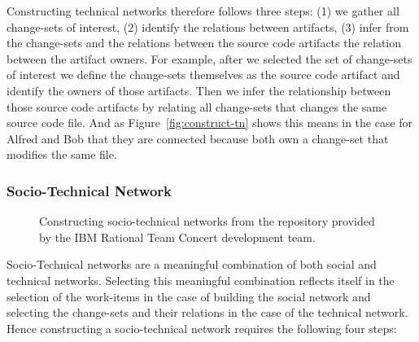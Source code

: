 Constructing technical networks therefore follows three steps: (1) we gather all change-sets of interest, (2) identify the relations between artifacts, (3) infer from the change-sets and the relations between the source code artifacts the relation between the artifact owners.
For example, after we selected the set of change-sets of interest we define the change-sets themselves as the source code artifact and identify the owners of those artifacts.
Then we infer the relationship between those source code artifacts by relating all change-sets that changes the same source code file.
And as Figure~\ref{fig:construct-tn} shows this means in the case for Alfred and Bob that they are connected because both own a change-set that modifies the same file.

\subsubsection{Socio-Technical Network}
\begin{figure*}[t!]
%	
  \centering
% 
%  
  \caption{Constructing socio-technical networks from the repository provided by the IBM Rational Team Concert development team.}
  \label{fig:construct-stc}
\end{figure*}

Socio-Technical networks are a meaningful combination of both social and technical networks.
Selecting this meaningful combination reflects itself in the selection of the work-items in the case of building the social network and selecting the change-sets and their relations in the case of the technical network.
Hence constructing a socio-technical network requires the following four steps:

